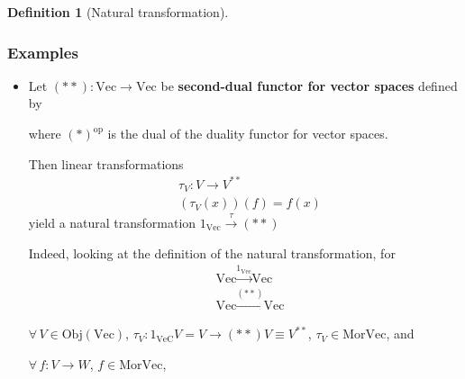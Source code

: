 \documentclass[twoside,landscape,10pt]{amsart}
\theoremstyle{plain}
\theoremstyle{definition}
\newtheorem{definition}{Definition}
\theoremstyle{remark}
\begin{document}
\begin{multicols*}{2}
\begin{definition}[Natural transformation]
\end{definition}


\subsubsection{Examples}

\begin{itemize}
  \item Let $(**):\text{Vec}\to \text{Vec}$ be \textbf{ second-dual functor for vector spaces } defined by 


where $(*)^{\text{op}}$ is the dual of the duality functor for vector spaces.  

Then linear transformations 
\[
\begin{aligned}
  & \tau_V: V \to V^{**} \\ 
  & (\tau_V(x))(f) = f(x)
\end{aligned}
\]
yield a natural transformation $1_{\text{Vec}} \xrightarrow{ \tau } (**)$

Indeed, looking at the definition of the natural transformation, for
\[
\begin{aligned}
  &  \text{Vec} \xrightarrow{ 1_{\text{Vec}} } \text{Vec} \\ 
  &  \text{Vec} \xrightarrow{ (**) } \text{Vec}
\end{aligned}
\]

$\forall \, V \in \text{Obj}(\text{Vec})$, $\tau_V:1_{\text{VeC}}V = V \to (**)V \equiv V^{**}$, $\tau_V \in \text{Mor}\text{Vec}$, and 

$\forall \, f: V\to W$, $f\in \text{Mor}\text{Vec}$,



\end{itemize}
\end{multicols*}
\end{document}
